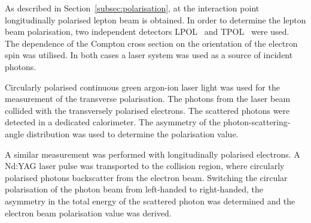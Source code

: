 As described in Section~\ref{subsec:polarisation}, at the interaction point longitudinally polarised lepton beam is obtained. In order to determine the lepton beam polarisation, two independent detectors LPOL~\cite{nim:a479:334} and TPOL~\cite{nim:a329:79} were used.
The dependence of the Compton cross section on the orientation of the electron spin was utilised. In both cases a laser system was used as a source of incident photons.

Circularly polarised continuous green argon-ion laser light was used for the measurement of the transverse polarisation. The photons from the laser beam collided with the transversely polarised electrons. The scattered photons were detected in a dedicated calorimeter. The asymmetry of the photon-scattering-angle distribution was used to determine the polarisation value.

A similar measurement was performed with longitudinally polarised electrons. A Nd:YAG laser pulse was transported to the collision region, where circularly polarised photons backscatter from the electron beam. Switching the circular polarisation of the photon beam from left-handed to right-handed, the asymmetry in the total energy of the scattered photon was determined and the electron beam polarisation value was derived.
